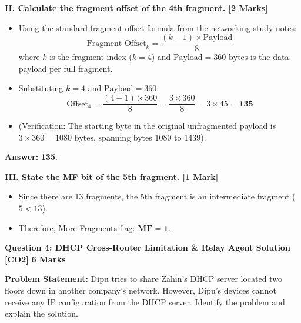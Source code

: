 \documentclass[11pt,a4paper]{article}
\newcommand{\questionheader}[3]{
    \vspace{0.35cm}
    \noindent\colorbox{qboxbg}{
        \parbox{\dimexpr\textwidth-2\fboxsep\relax}{
            \textbf{\textcolor{primary}{\large #1}} \hfill \textbf{\textcolor{accent}{[#2]}} \hfill \textbf{\textcolor{secondary}{#3 Marks}}
        }
    }
    \vspace{0.15cm}
}
\begin{document}
\textbf{II. Calculate the fragment offset of the 4th fragment. [2 Marks]}
\begin{itemize}
    \item Using the standard fragment offset formula from the networking study notes:
    \[
    \text{Fragment Offset}_k = \frac{(k - 1) \times \text{Payload}}{8}
    \]
    where $k$ is the fragment index ($k = 4$) and $\text{Payload} = 360\text{ bytes}$ is the data payload per full fragment.
    \item Substituting $k = 4$ and $\text{Payload} = 360$:
    \[
    \text{Offset}_4 = \frac{(4 - 1) \times 360}{8} = \frac{3 \times 360}{8} = 3 \times 45 = \mathbf{135}
    \]
    \item (Verification: The starting byte in the original unfragmented payload is $3 \times 360 = 1080\text{ bytes}$, spanning bytes 1080 to 1439).
\end{itemize}
\textbf{Answer:} \textbf{135}.

\textbf{III. State the MF bit of the 5th fragment. [1 Mark]}
\begin{itemize}
    \item Since there are 13 fragments, the 5th fragment is an intermediate fragment ($5 < 13$).
    \item Therefore, More Fragments flag: $\mathbf{MF = 1}$.
\end{itemize}

\newpage
\questionheader{Question 4: DHCP Cross-Router Limitation \& Relay Agent Solution}{CO2}{6}

\textbf{Problem Statement:}
Dipu tries to share Zahin's DHCP server located two floors down in another company's network. However, Dipu's devices cannot receive any IP configuration from the DHCP server. Identify the problem and explain the solution.
\end{document}
